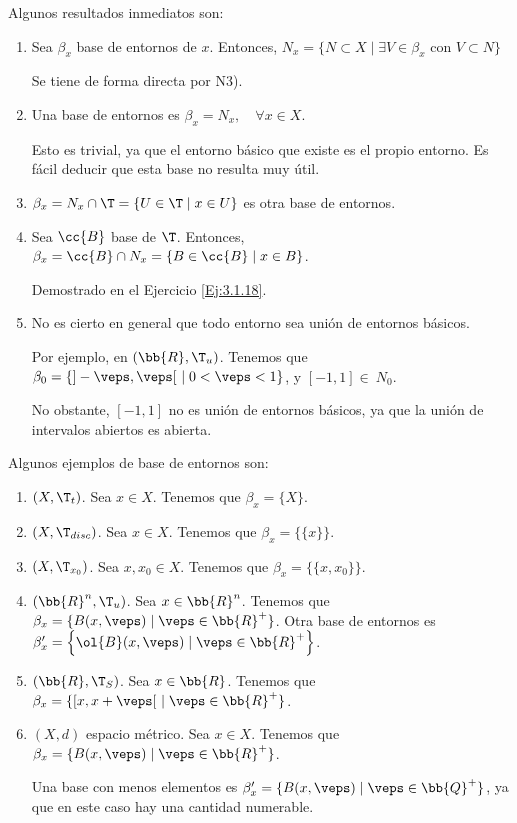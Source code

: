 Algunos resultados inmediatos son:
\begin{enumerate}
    \item Sea $\beta_x$ base de entornos de $x$. Entonces, $N_x=\{N\subset X\mid \exists V\in \beta_x\text{ con } V\subset N\}$

    Se tiene de forma directa por N3).

    \item Una base de entornos es $\beta_x=N_x, \quad \forall x\in X$.

    Esto es trivial, ya que el entorno básico que existe es el propio entorno. Es fácil deducir que esta base no resulta muy útil.
    
    \item $\beta_x=N_x\cap \T=\{U\in \T\mid x\in U\}$ es otra base de entornos.
    
    \item Sea $\cc{B}$ base de $\T$. Entonces, $\beta_x=\cc{B}\cap N_x=\{B\in \cc{B}\mid x\in B\}$.
    
    Demostrado en el Ejercicio \ref{Ej:3.1.18}.
    \item No es cierto en general que todo entorno sea unión de entornos básicos.

    Por ejemplo, en $(\bb{R}, \T_u)$. Tenemos que $\beta_0=\{]-\veps, \veps[~\mid 0<\veps<1\}$, y $[-1,1]\in~N_0$.

    No obstante, $[-1,1]$ no es unión de entornos básicos, ya que la unión de intervalos abiertos es abierta.
\end{enumerate}

\begin{ejemplo} Algunos ejemplos de base de entornos son:
\begin{enumerate}
    \item $(X, \T_t)$. Sea $x\in X$. Tenemos que $\beta_x=\{X\}$.

    \item $(X, \T_{disc})$. Sea $x\in X$. Tenemos que $\beta_x=\{\{x\}\}$.

    \item $(X, \T_{x_0})$. Sea $x,x_0\in X$. Tenemos que $\beta_x=\{\{x,x_0\}\}$.

    \item $(\bb{R}^n, \T_{u})$. Sea $x\in \bb{R}^n$. Tenemos que $\beta_x=\{B(x,\veps)\mid \veps\in \bb{R}^+\}$. Otra base de entornos es $\beta'_x=\left\{\ol{B}(x,\veps)\mid \veps\in \bb{R}^+\right\}$.

    \item $(\bb{R}, \T_{S})$. Sea $x\in \bb{R}$. Tenemos que $\beta_x=\{[x,x+\veps[~\mid \veps\in \bb{R}^+\}$.

    \item $(X, d)$ espacio métrico. Sea $x\in X$. Tenemos que $\beta_x=\{B(x,\veps)\mid \veps\in \bb{R}^+\}$.
    
    Una base con menos elementos es $\beta_x'=\{B(x,\veps)\mid \veps\in \bb{Q}^+\}$, ya que en este caso hay una cantidad numerable.
\end{enumerate}
    
\end{ejemplo}



